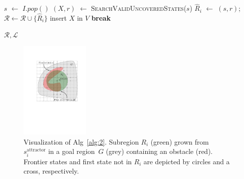 \documentclass[letterpaper, 10 pt, conference]{ieeeconf}  %
\newcommand{\calL}{\ensuremath{\mathcal{L}}\xspace}
\newcommand{\calR}{\ensuremath{\mathcal{R}}\xspace}
\newcommand{\sAttract}{\ensuremath{s^{\text{attractor}}_i}\xspace}
\begin{document}
\begin{algorithm}[t]
\begin{algorithmic}[1]
\vspace{2mm}        
        
         \label{alg:1:iv_loop}
            \State $s$ $\leftarrow$ $I.pop()$
			\If {$\neq R \in \calR$ s.t. $s \in R$ }      
\State $(X, r)$ $\leftarrow$ \textsc{SearchValidUncoveredStates}($s$)
                \State $\hat{R}_i$ $\leftarrow$ $(s,r)$;
				\hspace{2mm}
				$\calR \leftarrow \calR \cup \{ \hat{R}_i \}$   \label{alg:1:iv_region}
                    \label{alg:1:x_states}
                    \State insert $X$ in $V$
                    \State \textbf{break} \label{alg:1:break}
                \EndIf
            \EndIf
        \EndWhile
    \EndWhile

  \vspace{2mm}

  \State \Return $\calR, \calL$
\EndProcedure
\end{algorithmic}
\end{algorithm}

\begin{figure}[tb]
  \centering
  	\includegraphics[width=0.3\textwidth]{Alg2.pdf}
  \caption{
  Visualization of Alg~\ref{alg:2}. Subregion $R_i$ (green) grown from $\sAttract$ in a goal region~$G$ (grey) containing an obstacle (red).
  Frontier states  and first state not in $R_i$ are depicted by circles and a cross, respectively.
}
   	\label{fig:alg2}
 \vspace{-3mm}
\end{figure}
\end{document}
